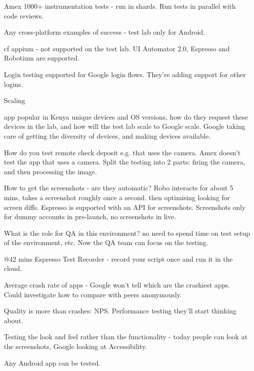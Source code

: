 Amex 1000+ instrumentation tests - run in shards. Run tests in parallel with code reviews. 

Any cross-platform examples of success - test lab only for Android. 

cf appium - not supported on the test lab. UI Automator 2.0, Espresso and Robotium are supported.

Login testing supported for Google login flows. They’re adding support for other logins.

Scaling

app popular in Kenya unique devices and OS versions, how do they request these devices in the lab, and how will the test lab scale to Google scale. Google taking care of getting the diversity of devices, and making devices available. 

How do you test remote check deposit e.g. that uses the camera. Amex doesn’t test the app that uses a camera. Split the testing into 2 parts: firing the camera, and then processing the image.

How to get the screenshots - are they automatic? Robo interacts for about 5 mins, takes a screenshot roughly once a second. then optimising looking for screen diffs. Espresso is supported with an API for screenshots. Screenshots only for dummy accounts in pre-launch, no screenshots in live.

What is the role for QA in this environment? no need to spend time on test setup of the environment, etc. Now the QA team can focus on the testing. 

@42 mins Espresso Test Recorder - record your script once and run it in the cloud.


Average crash rate of apps - Google won’t tell which are the crashiest apps. Could investigate how to compare with peers anonymously. 

Quality is more than crashes: NPS. Performance testing they’ll start thinking about. 

Testing the look and feel rather than the functionality - today people can look at the screenshots, Google looking at Accessibility. 

Any Android app can be tested. 

